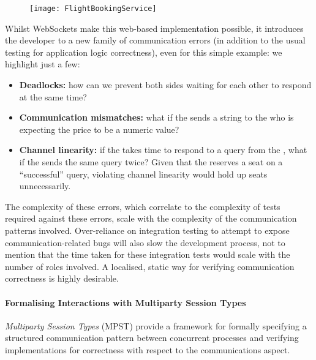 \begin{figure}[!ht]
\centering
\texttt{[image: FlightBookingService]}
\label{fig:flightbook}
\end{figure}

Whilst WebSockets make this web-based implementation possible, 
it introduces the developer to a new family of communication errors
(in addition to the usual testing for application logic correctness), 
even for this simple example:
we highlight just a few:

\begin{itemize}

\item
\textbf{Deadlocks:} how can we prevent both sides waiting for 
each other to respond at the same time?

\item 
\textbf{Communication mismatches:} what if the 
 sends a string to the 
who is expecting the price to be a numeric value?

\item
\textbf{Channel linearity:} if the 
takes time to respond to a query from the ,
what if the  sends the same query twice? 
Given that the  reserves a seat on
a ``successful'' query, violating channel linearity
would hold up seats unnecessarily.

\end{itemize}

The complexity of these errors,
which correlate to the complexity of tests 
required against these errors, 
scale with the complexity of the 
communication patterns involved. 
Over-reliance on integration testing
to attempt to expose communication-related bugs 
will also slow the
development process, not to mention that the time 
taken for these
integration tests would scale with the number of roles involved.
A localised, static way for verifying communication correctness
is highly desirable.

\paragraph{Formalising Interactions with
Multiparty Session Types}
\textit{Multiparty Session Types} (MPST) \cite{MPST} 
provide a framework for formally specifying 
a structured communication pattern 
between concurrent processes and 
verifying implementations for 
correctness with respect to the communications aspect. 


